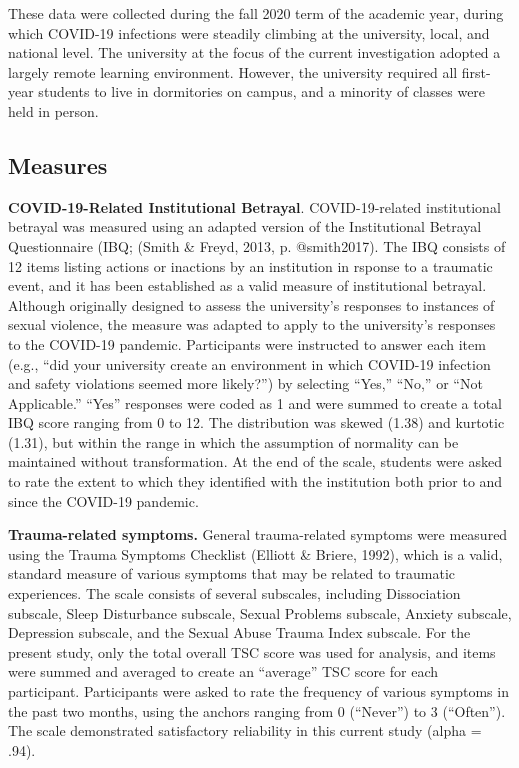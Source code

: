 \documentclass[
  english,
  man, noextraspace]{apa6}
\begin{document}
These data were collected during the fall 2020 term of the academic year, during which COVID-19 infections were steadily climbing at the university, local, and national level. The university at the focus of the current investigation adopted a largely remote learning environment. However, the university required all first-year students to live in dormitories on campus, and a minority of classes were held in person.

\hypertarget{measures}{%
\subsection{Measures}\label{measures}}

\textbf{COVID-19-Related Institutional Betrayal}. COVID-19-related institutional betrayal was measured using an adapted version of the Institutional Betrayal Questionnaire (IBQ; (Smith \& Freyd, 2013, p. @smith2017). The IBQ consists of 12 items listing actions or inactions by an institution in rsponse to a traumatic event, and it has been established as a valid measure of institutional betrayal. Although originally designed to assess the university's responses to instances of sexual violence, the measure was adapted to apply to the university's responses to the COVID-19 pandemic. Participants were instructed to answer each item (e.g., \enquote{did your university create an environment in which COVID-19 infection and safety violations seemed more likely?}) by selecting \enquote{Yes,} \enquote{No,} or \enquote{Not Applicable.} \enquote{Yes} responses were coded as 1 and were summed to create a total IBQ score ranging from 0 to 12. The distribution was skewed (1.38) and kurtotic (1.31), but within the range in which the assumption of normality can be maintained without transformation. At the end of the scale, students were asked to rate the extent to which they identified with the institution both prior to and since the COVID-19 pandemic.

\textbf{Trauma-related symptoms.} General trauma-related symptoms were measured using the Trauma Symptoms Checklist (Elliott \& Briere, 1992), which is a valid, standard measure of various symptoms that may be related to traumatic experiences. The scale consists of several subscales, including Dissociation subscale, Sleep Disturbance subscale, Sexual Problems subscale, Anxiety subscale, Depression subscale, and the Sexual Abuse Trauma Index subscale. For the present study, only the total overall TSC score was used for analysis, and items were summed and averaged to create an \enquote{average} TSC score for each participant. Participants were asked to rate the frequency of various symptoms in the past two months, using the anchors ranging from 0 (\enquote{Never}) to 3 (\enquote{Often}). The scale demonstrated satisfactory reliability in this current study (alpha = .94).
\end{document}
